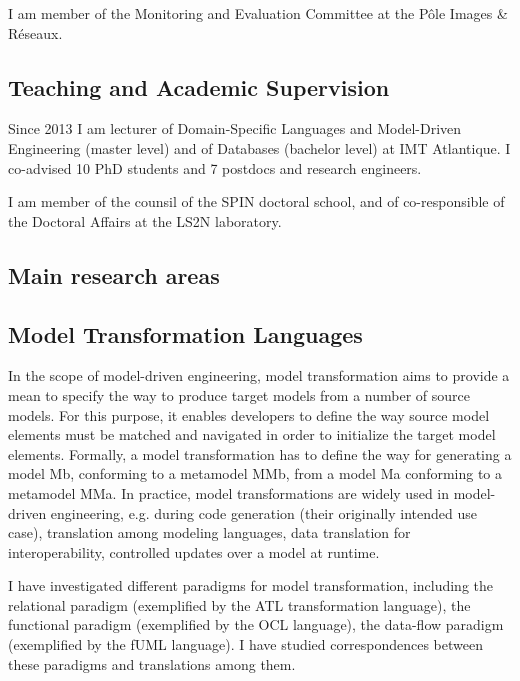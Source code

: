 
I am member of the Monitoring and Evaluation Committee at the Pôle Images \& Réseaux.

\subsection{Teaching and Academic Supervision}

Since 2013 I am lecturer of Domain-Specific Languages and Model-Driven Engineering (master level) and of Databases (bachelor level) at IMT Atlantique. I co-advised 10 PhD students and 7 postdocs and research engineers.

I am member of the counsil of the SPIN doctoral school, and of co-responsible of the Doctoral Affairs at the LS2N laboratory.

\subsection{Main research areas}

\subsection*{Model Transformation Languages}
In the scope of model-driven engineering, model transformation aims to provide a mean to specify the way to produce target models from a number of source models. For this purpose, it enables developers to define the way source model elements must be matched and navigated in order to initialize the target model elements. Formally, a model transformation has to define the way for generating a model Mb, conforming to a metamodel MMb, from a model Ma conforming to a metamodel MMa. In practice, model transformations are widely used in model-driven engineering, e.g. during code generation (their originally intended use case), translation among modeling languages, data translation for interoperability, controlled updates over a model at runtime.

I have investigated different paradigms for model transformation, including the relational paradigm (exemplified by the ATL transformation language), the functional paradigm (exemplified by the OCL language), the data-flow paradigm (exemplified by the fUML language). I have studied correspondences between these paradigms and translations among them. 

